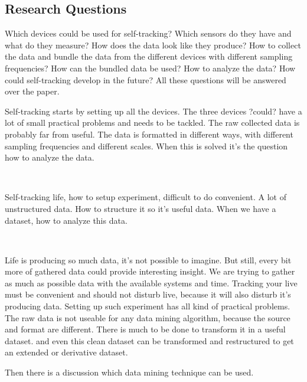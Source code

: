 	\subsection{Research Questions}
		Which devices could be used for self-tracking? Which sensors do they have and what do they measure? How does the data look like they produce?
		How to collect the data and bundle the data from the different devices with different sampling frequencies? How can the bundled data be used?
		How to analyze the data? How could self-tracking develop in the future? All these questions will be answered over the paper.
		
		\iffalse
		Which devices could be used for self-tracking? What do they measure?
		How does the data look like? How to bundle the data? How to deal with different sampling frequencies.
		How can the data be used? 
		How can self-tracking develop in the future.
		
		- State of this generation of sensors
		- Different sample frequency
		- Analyze dataset
		- Future
		\fi

		\iffalse
		Self-tracking starts by setting up all the devices. The three devices ?could? have a lot of small practical problems and needs to be tackled. The raw collected data is probably far from useful. The data is formatted in different ways, with different sampling frequencies and different scales. When this is solved it's the question how to analyze the data.

		\

		Self-tracking life, how to setup experiment, difficult to do convenient. A lot of unstructured data. How to structure it so it's useful data. 
		When we have a dataset, how to analyze this data. 

		\

		Life is producing so much data, it's not possible to imagine. But still, every bit more of gathered data could provide interesting insight. We are trying to gather as much as possible data with the available systems and time. Tracking your live must be convenient and should not disturb live, because it will also disturb it's producing data. Setting up such experiment has all kind of practical problems. The raw data is not useable for any data mining algorithm, because the source and format are different. There is much to be done to transform it in a useful dataset. and even this clean dataset can be transformed and restructured to get an extended or derivative dataset. 

		Then there is a discussion which data mining technique can be used. 


